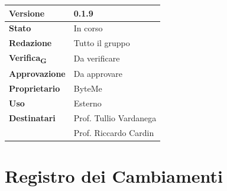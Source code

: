 \documentclass[11pt,a4paper]{article}
\newcommand{\gls}[1]{#1\textsubscript{G}}
\begin{document}
\begin{titlepage}
    \begin{table}[H]
        \centering
        \begin{tabular}{|l|p{5cm}|}
            \hline
            \textbf{Versione} & 0.1.9 \\
            \hline
            \textbf{Stato} & In corso \\
            \hline
            \textbf{Redazione} & Tutto il gruppo\\
            \hline
            \textbf{\gls{Verifica}} & Da verificare\\
            \hline
            \textbf{Approvazione} & Da approvare\\
            \hline
            \textbf{Proprietario} & ByteMe \\
            \hline
            \textbf{Uso} & Esterno \\
            \hline
            \textbf{Destinatari} & Prof. Tullio Vardanega \\ & Prof. Riccardo Cardin \\
            \hline
        \end{tabular}
    \end{table}
    
    \vfill
\end{titlepage}

\thispagestyle{empty}
\section*{Registro dei Cambiamenti}
\end{document}
